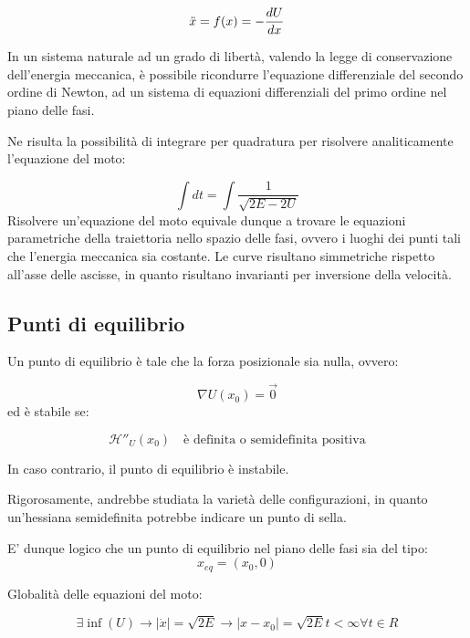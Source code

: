 \documentclass{article}
\begin{document}
\begin{equation}
    \Ddot{x}=f(x)=-\frac{dU}{dx}
\end{equation}

In un sistema naturale ad un grado di libertà, valendo la legge di conservazione dell'energia meccanica,
è possibile ricondurre l'equazione differenziale del secondo ordine di Newton, ad un sistema di equazioni differenziali del primo ordine nel piano delle fasi.

Ne risulta la possibilità di integrare per quadratura per risolvere analiticamente l'equazione del moto:

\begin{equation}
    \int dt = \int \frac{1}{\sqrt{2E-2U}}
\end{equation}
Risolvere un'equazione del moto equivale dunque a trovare le equazioni parametriche della traiettoria nello spazio delle fasi, ovvero i luoghi dei punti tali che l'energia meccanica sia costante.
Le curve risultano simmetriche rispetto all'asse delle ascisse, in quanto risultano invarianti per inversione della velocità.



\subsection{Punti di equilibrio}
Un punto di equilibrio è tale che la forza posizionale sia nulla, ovvero:

\begin{equation}
    \nabla U(x_0)=\vec{0}
\end{equation}
ed è stabile se:

\begin{equation}
    \mathcal{H}''_U(x_0) \quad \text{è definita o semidefinita positiva}
\end{equation}

In caso contrario, il punto di equilibrio è instabile.

Rigorosamente, andrebbe studiata la varietà delle configurazioni, in quanto un'hessiana semidefinita potrebbe indicare un punto di sella.


E' dunque logico che un punto di equilibrio nel piano delle fasi sia del tipo:
\begin{equation}
    x_{eq}=(x_0,0)
\end{equation}




Globalità delle equazioni del moto:

\begin{equation}
    \exists \inf(U) \rightarrow |\dot x|=\sqrt{2E} \rightarrow |x-x_0|=\sqrt{2E}t<\infty \forall t \in R
\end{equation}
\end{document}

